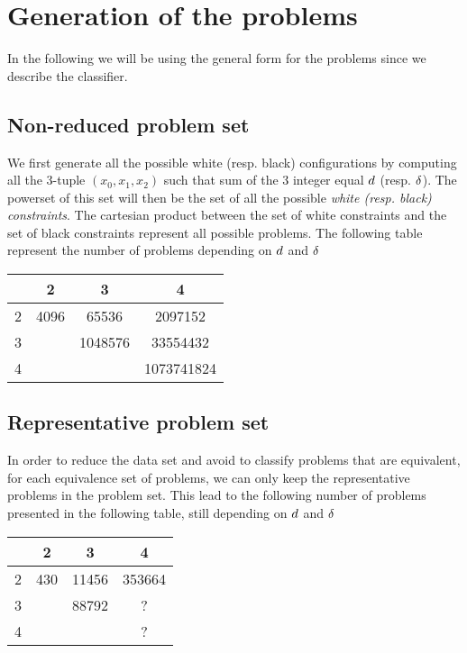 \section{Generation of the problems}
In the following we will be using the general form for the problems since we describe the classifier.
\subsection{Non-reduced problem set}
We first generate all the possible white (resp. black) configurations by computing all the 3-tuple $(x_0,x_1, x_2)$ such that sum of the 3 integer equal $\wdd$ (resp. $\bdd$).
The powerset of this set will then be the set of all the possible \textit{white (resp. black) constraints}.
The cartesian product between the set of white constraints and the set of black constraints represent all possible problems. The following table represent the number of problems depending on $\wdd$ and $\bdd$
\begin{center}
\begin{tabular}{ | c | c | c | c |}
 \hline
 \diagbox{$\wdd$}{$\bdd$} & 2 & 3 & 4 \\ 
 \hline
 2 & 4096 & 65536 & 2097152\\
 \hline
 3 &  & 1048576 & 33554432\\
 \hline
 4 &  &  &  1073741824\\
\hline
\end{tabular}
\end{center}
\subsection{Representative problem set}
In order to reduce the data set and avoid to classify problems that are equivalent, for each equivalence set of problems, we can only keep the representative problems in the problem set. This lead to the following number of problems presented in the following table, still depending on $\wdd$ and $\bdd$
\begin{center}
\begin{tabular}{ | c | c | c | c |}
 \hline
 \diagbox{$\wdd$}{$\bdd$} & 2 & 3 & 4 \\ 
 \hline
 2 & 430 & 11456 & 353664\\
 \hline
 3 &  & 88792 & ?\\
 \hline
 4 &  &  &  ?\\
\hline
\end{tabular}
\end{center}

